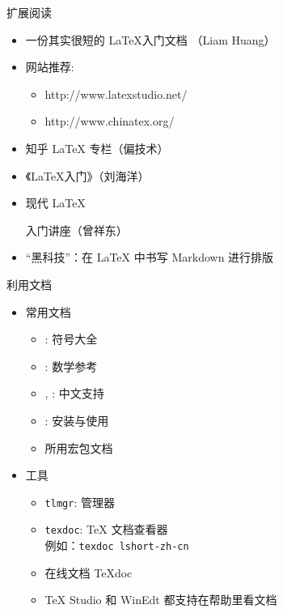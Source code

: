 \begin{frame}{扩展阅读}
  \begin{itemize}
    \item 一份其实很短的 \LaTeX 入门文档 （Liam Huang）
    \item 网站推荐:
          \begin{itemize}
            \item http://www.latexstudio.net/
            \item http://www.chinatex.org/
          \end{itemize}
    \item 知乎 \LaTeX{} 专栏（偏技术）
    \item 《\LaTeX{}入门》（刘海洋）
    \item 现代 LaTeX

          入门讲座（曾祥东）
    \item “黑科技”：在 \LaTeX{} 中书写 Markdown 进行排版

  \end{itemize}
\end{frame}

\begin{frame}[fragile]{利用文档}
  \begin{itemize}
    \item 常用文档
          \begin{itemize}
            \item {}: 符号大全
            \item {}: 数学参考
            \item {}, : 中文支持
            \item {}: \TL 安装与使用
            \item 所用宏包文档
          \end{itemize}
    \item 工具
          \begin{itemize}
            \item \verb|tlmgr|: \TL 管理器
            \item \verb|texdoc|: \TeX{} 文档查看器\\
                  例如：\verb|texdoc lshort-zh-cn|
            \item 在线文档 \TeX{}doc 
            \item TeX Studio 和 WinEdt 都支持在帮助里看文档
          \end{itemize}
  \end{itemize}
\end{frame}

